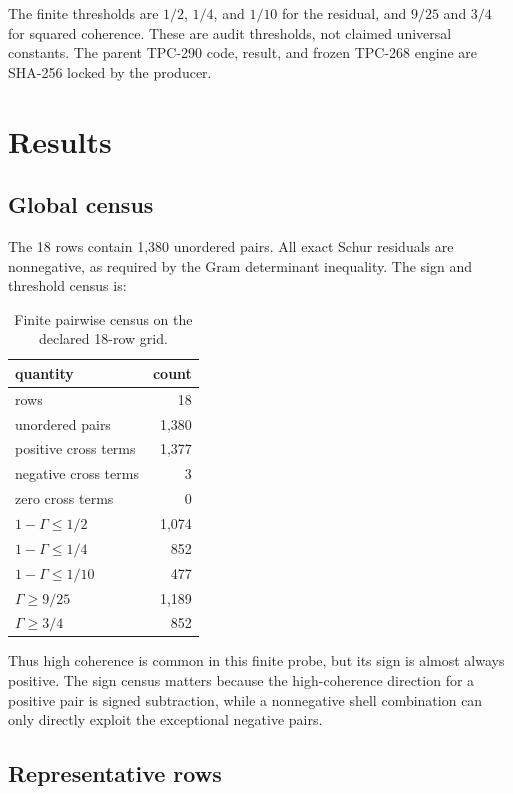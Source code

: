 \documentclass[10pt]{article}
\begin{document}
The finite thresholds are $1/2$, $1/4$, and $1/10$ for the residual, and
$9/25$ and $3/4$ for squared coherence.  These are audit thresholds, not
claimed universal constants.  The parent TPC-290 code, result, and frozen
TPC-268 engine are SHA-256 locked by the producer.

\section{Results}

\subsection{Global census}

The 18 rows contain 1,380 unordered pairs.  All exact Schur residuals are
nonnegative, as required by the Gram determinant inequality.  The sign and
threshold census is:

\begin{table}[ht]
\centering
\small
\caption{Finite pairwise census on the declared 18-row grid.}
\label{tab:census}
\begin{tabular}{@{}lr@{}}
\toprule
quantity & count \\
\midrule
rows & 18 \\
unordered pairs & 1,380 \\
positive cross terms & 1,377 \\
negative cross terms & 3 \\
zero cross terms & 0 \\
$1-\Gamma\leq1/2$ & 1,074 \\
$1-\Gamma\leq1/4$ & 852 \\
$1-\Gamma\leq1/10$ & 477 \\
$\Gamma\geq9/25$ & 1,189 \\
$\Gamma\geq3/4$ & 852 \\
\bottomrule
\end{tabular}
\end{table}

Thus high coherence is common in this finite probe, but its sign is almost
always positive.  The sign census matters because the high-coherence
direction for a positive pair is signed subtraction, while a nonnegative
shell combination can only directly exploit the exceptional negative pairs.

\subsection{Representative rows}
\end{document}
